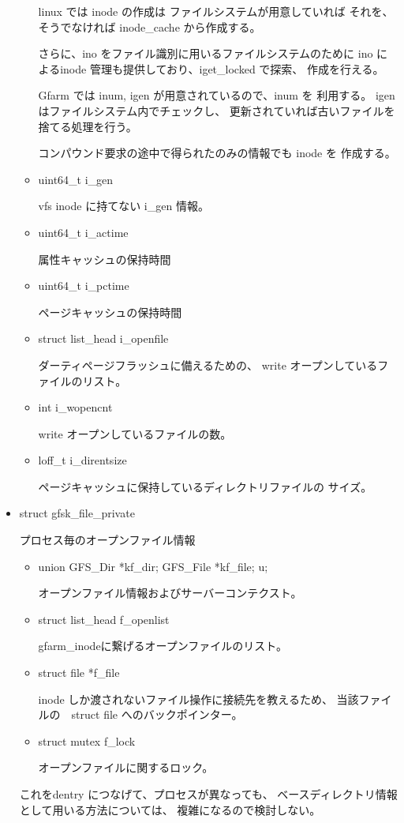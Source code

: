 \begin{itemize}
\begin{itemize}
		linux では inode の作成は ファイルシステムが用意していれば
		それを、そうでなければ inode_cache から作成する。

		さらに、ino をファイル識別に用いるファイルシステムのために
		ino によるinode 管理も提供しており、iget_locked で探索、
		作成を行える。

		Gfarm では inum, igen が用意されているので、inum を
		利用する。 igen はファイルシステム内でチェックし、
		更新されていれば古いファイルを捨てる処理を行う。

		コンパウンド要求の途中で得られたのみの情報でも inode を
		作成する。
		\item	uint64_t        i_gen	\par
			vfs inode に持てない i_gen 情報。
		\item	uint64_t	i_actime	\par
			属性キャッシュの保持時間
		\item	uint64_t	i_pctime	\par
			ページキャッシュの保持時間
		\item	struct list_head i_openfile	\par
			ダーティページフラッシュに備えるための、
			write オープンしているファイルのリスト。
		\item	int		i_wopencnt	\par
			write オープンしているファイルの数。
		\item	loff_t          i_direntsize	\par
			ページキャッシュに保持しているディレクトリファイルの
			サイズ。
		\end{itemize}

        \item	struct gfsk_file_private \par
		プロセス毎のオープンファイル情報
		\begin{itemize}
              	\item union{ GFS_Dir  *kf_dir; GFS_File *kf_file; }u; \par
			オープンファイル情報およびサーバーコンテクスト。
              	\item struct list_head f_openlist	\par
			gfarm_inodeに繋げるオープンファイルのリスト。
              	\item struct file *f_file	\par
			inode しか渡されないファイル操作に接続先を教えるため、
			当該ファイルの　struct file へのバックポインター。
              	\item struct mutex f_lock	\par
			オープンファイルに関するロック。
		\end{itemize}
		これをdentry につなげて、プロセスが異なっても、
		ベースディレクトリ情報として用いる方法については、
		複雑になるので検討しない。

	\end{itemize}

